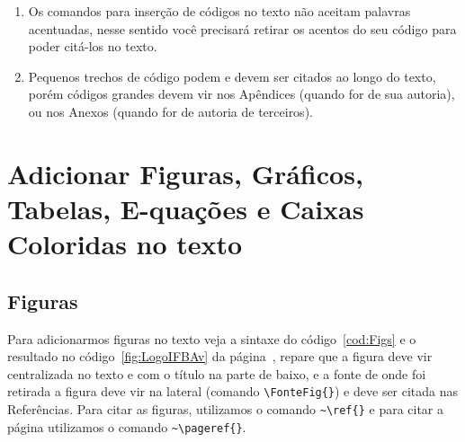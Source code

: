 \vspace{5mm}
\begin{Codigo}[language=tex, caption=Forma de importar Códigos para o texto, label=cod:Codimporta2]
\end{Codigo}

\vspace{0.6cm}
\begin{CaixaVermelha}
     \begin{enumerate}
         \item Os comandos para inserção de códigos no texto não aceitam palavras acentuadas, nesse sentido você precisará retirar os acentos do seu código para poder citá-los no texto.
        \item Pequenos trechos de código podem e devem ser citados ao longo do texto, porém códigos grandes devem vir nos Apêndices (quando for de sua autoria), ou nos Anexos (quando for de autoria de terceiros).
     \end{enumerate}
\end{CaixaVermelha}



\section{Adicionar Figuras, Gráficos, Tabelas, E-quações e Caixas Coloridas no texto}

\subsection{Figuras}

Para adicionarmos figuras no texto veja a sintaxe do código~\ref{cod:Figs} e o resultado no código~\ref{fig:LogoIFBAv} da página~\pageref{fig:LogoIFBAv},  repare que a figura deve vir centralizada no texto e com o título na parte de baixo, e a fonte de onde foi retirada a figura deve vir na lateral (comando \verb|\FonteFig{}|) e deve ser citada nas Referências. Para citar as figuras, utilizamos o comando \verb|~\ref{}| e para citar a página utilizamos o comando \verb|~\pageref{}|.

\newpage\clearpage\pagebreak

